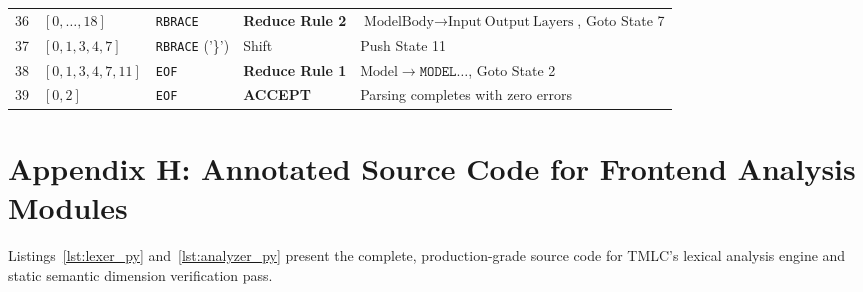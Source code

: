 \documentclass[11pt,a4paper]{article}
\begin{document}
\begin{table}[htbp]
\begin{tabular}{cllll}
36 & $[0, \dots, 18]$ & \texttt{RBRACE} & \textbf{Reduce Rule 2} & $\text{ModelBody} \rightarrow \text{Input} \ \text{Output} \ \text{Layers}$, Goto State 7 \\
37 & $[0, 1, 3, 4, 7]$ & \texttt{RBRACE} ('\}') & Shift & Push State 11 \\
38 & $[0, 1, 3, 4, 7, 11]$ & \texttt{EOF} & \textbf{Reduce Rule 1} & $\text{Model} \rightarrow \texttt{MODEL} \dots$, Goto State 2 \\
39 & $[0, 2]$ & \texttt{EOF} & \textbf{ACCEPT} & Parsing completes with zero errors \\
\bottomrule
\end{tabular}
\end{table}


\newpage
\section{Appendix H: Annotated Source Code for Frontend Analysis Modules}
\label{app:frontend_source}

Listings~\ref{lst:lexer_py} and~\ref{lst:analyzer_py} present the complete, production-grade source code for TMLC's lexical analysis engine and static semantic dimension verification pass.
\end{document}
